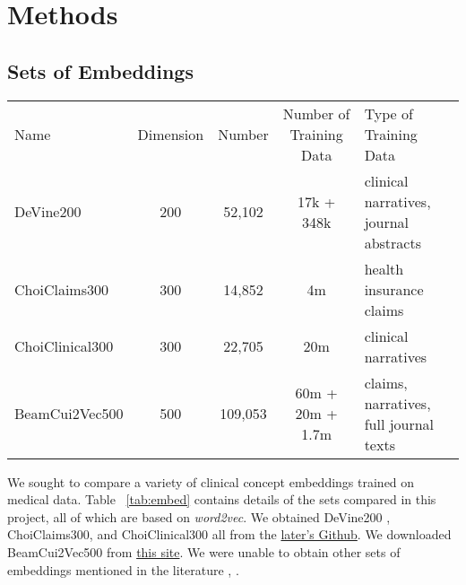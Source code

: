 \documentclass[11pt,a4paper]{article}
\begin{document}
\section{Methods}

\subsection{Sets of Embeddings}

\begin{table*}[h!]
	
	\begin{center}
		\begin{tabular}{lcccl} %
			Name & Dimension & Number & Number of Training Data& Type of Training Data \\
			\hlineB{4}
			DeVine200 & 200 & 52,102 & 17k + 348k &clinical narratives, journal abstracts\\
			\hline
			ChoiClaims300 & 300 & 14,852& 4m&health insurance claims\\
			\hline
			ChoiClinical300 & 300 & 22,705&20m& clinical narratives\\
			\hline
			BeamCui2Vec500 & 500 & 109,053&60m + 20m + 1.7m& claims, narratives, full journal texts\\
		\end{tabular}
	\end{center}
	\caption{Characteristics of the embeddings compared, including the name referred, the embedding dimensions, the number of embeddings in the dataset, and the type of data used to train them.}
	\label{tab:embed}
\end{table*}

We sought to compare a variety of clinical concept embeddings trained on medical data. Table ~\ref{tab:embed} contains details of the sets compared in this project, all of which are based on \emph{word2vec}. We obtained DeVine200 \cite{devineMedicalSemanticSimilarity2014}, ChoiClaims300, and ChoiClinical300 \cite{choiLearningLowDimensionalRepresentations2016} all from the \href{https://github.com/clinicalml/embeddings}{later's Github}. We downloaded BeamCui2Vec500 \cite{beamClinicalConceptEmbeddings2018} from \href{https://figshare.com/s/00d69861786cd0156d81}{this site}. We were unable to obtain other sets of embeddings mentioned in the literature \cite{minarro-gimenezExploringApplicationDeep2014}, \cite{zhangAdaptingWordEmbeddings2018} \cite{xiangTimesensitiveClinicalConcept2019}.
\end{document}
